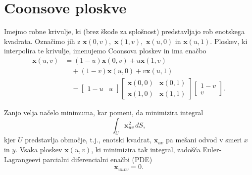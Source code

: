 \documentclass[twocolumn, 10pt]{article}    %
\begin{document}

\section{Coonsove ploskve}
Imejmo robne krivulje, ki (brez škode za splošnost) predstavljajo rob enotskega kvadrata.
Označimo jih z $\mathbf{x}(0, v),$ $ \mathbf{x}(1, v),$ $ \mathbf{x}(u, 0) $ in  $\mathbf{x}(u, 1).$
Ploskev, ki interpolira te krivulje, imenujemo Coonsova ploskev in ima enačbo 
\begin{align}
    \mathbf{x}(u, v) &= (1 - u)\mathbf{x}(0, v) + u\mathbf{x}(1, v) \nonumber \\
    &\quad + (1 - v)\mathbf{x}(u, 0) + v\mathbf{x}(u, 1) \nonumber \\
    &\quad - 
    \begin{bmatrix}
        1 - u & u
    \end{bmatrix}
    \begin{bmatrix}
        \mathbf{x}(0, 0) & \mathbf{x}(0, 1) \\
        \mathbf{x}(1, 0) & \mathbf{x}(1, 1)
    \end{bmatrix}
    \begin{bmatrix}
        1 - v \\
        v
    \end{bmatrix}.
    \label{eq:coons}
\end{align}

Zanjo velja\cite{nielson1978} načelo minimuma, kar pomeni, da minimizira integral 
\begin{equation}
    \int_U \textbf{x}_{uv}^2 \, dS,
\end{equation}
kjer $U$ predstavlja območje, t.j., enotski kvadrat, $\textbf{x}_{uv}$ pa mešani odvod v smeri $x$ in $y$.
Vsaka ploskev $\mathbf{x}(u,v)$, ki minimizira tak integral, zadošča Euler-Lagrangeevi parcialni diferencialni enačbi (PDE)
\begin{equation}
    \textbf{x}_{uuvv} = 0.
    \label{eq:ELPDE}
\end{equation}
\end{document}
